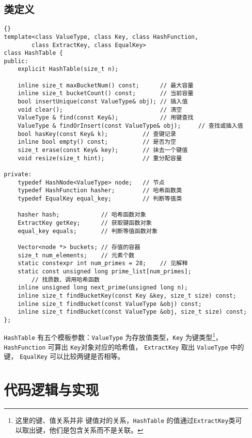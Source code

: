 \subsection{类定义}
{
\begin{lstlisting}[firstnumber=435, caption=HashTable 类定义]{}
template<class ValueType, class Key, class HashFunction,
        class ExtractKey, class EqualKey>
class HashTable {
public:
    explicit HashTable(size_t n);

    inline size_t maxBucketNum() const;      // 最大容量
    inline size_t bucketCount() const;       // 当前容量
    bool insertUnique(const ValueType& obj); // 插入值
    void clear();                            // 清空
    ValueType & find(const Key&);            // 用键查找
    ValueType & findOrInsert(const ValueType& obj);     // 查找或插入值
    bool hasKey(const Key& k);          // 查键记录
    inline bool empty() const;          // 是否为空
    size_t erase(const Key& key);       // 抹去一个键值
    void resize(size_t hint);           // 重分配容量

private:
    typedef HashNode<ValueType> node;   // 节点
    typedef HashFunction hasher;        // 哈希函数类
    typedef EqualKey equal_key;         // 判断等值类

    hasher hash;            // 哈希函数对象
    ExtractKey getKey;      // 获取键函数对象
    equal_key equals;       // 判断等值函数对象

    Vector<node *> buckets; // 存值的容器
    size_t num_elements;    // 元素个数
    static constexpr int num_primes = 28;    // 见解释
    static const unsigned long prime_list[num_primes];
        // 找质数、调用哈希函数
    inline unsigned long next_prime(unsigned long n);
    inline size_t findBucketKey(const Key &key, size_t size) const;
    inline size_t findBucket(const ValueType &obj) const;
    inline size_t findBucket(const ValueType &obj, size_t size) const;
};
\end{lstlisting}


\lstinline{HashTable} 有五个模板参数：\lstinline{ValueType} 为存放值类型，\lstinline{Key} 为键类型\footnote{这里的键、值关系并非%
键值对的关系，\lstinline{HashTable} 的值通过\lstinline{ExtractKey}类可以取出键，他们是包含关系而不是关联。}，%
\lstinline{HashFunction} 可算出 \lstinline{Key}对象对应的哈希值， \lstinline{ExtractKey} 取出 \lstinline{ValueType} 中的键，%
\lstinline{EqualKey} 可以比较两键是否相等。

\section{代码逻辑与实现}

}
